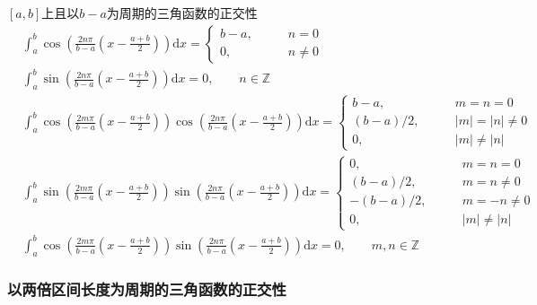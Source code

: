 \documentclass[lang = cn, scheme = chinese, thmcnt = section]{elegantbook}
\newcommand{\Z}{\mathbb{Z}}            %
\newcommand{\dd}{\mathrm{d}}           %
\begin{document}
\begin{theorem}{$[a,b]$上且以$b-a$为周期的三角函数的正交性}
	\begin{align*}
		& \int_{a}^{b}\cos \left(\frac{2n\pi}{b-a}\left(x-\frac{a+b}{2}\right)\right)\dd x=\begin{cases}
			b-a,\qquad & n=0\\
			0,\qquad & n\ne 0
		\end{cases}\\
		& \int_{a}^{b}\sin \left(\frac{2n\pi}{b-a}\left(x-\frac{a+b}{2}\right)\right)\dd x=0,\qquad n\in\Z\\
		& \int_{a}^{b}\cos \left(\frac{2m\pi}{b-a}\left(x-\frac{a+b}{2}\right)\right)\cos \left(\frac{2n\pi}{b-a}\left(x-\frac{a+b}{2}\right)\right) \dd x=\begin{cases}
			b-a,\qquad & m=n=0\\
			(b-a)/2,\qquad & |m|=|n|\ne 0\\
			0,\qquad & |m|\ne |n|
		\end{cases}\\
		& \int_{a}^{b}\sin \left(\frac{2m\pi}{b-a}\left(x-\frac{a+b}{2}\right)\right)\sin \left(\frac{2n\pi}{b-a}\left(x-\frac{a+b}{2}\right)\right) \dd x=\begin{cases}
			0,\qquad & m=n=0\\
			(b-a)/2,\qquad & m=n\ne 0\\
			-(b-a)/2,\qquad & m=-n\ne 0\\
			0,\qquad & |m|\ne |n|
		\end{cases}\\
		& \int_{a}^{b}\cos \left(\frac{2m\pi}{b-a}\left(x-\frac{a+b}{2}\right)\right)\sin \left(\frac{2n\pi}{b-a}\left(x-\frac{a+b}{2}\right)\right) \dd x=0,\qquad m,n\in\Z
	\end{align*}
\end{theorem}

\subsubsection{以两倍区间长度为周期的三角函数的正交性}
\end{document}
